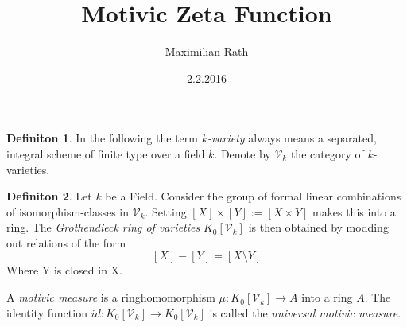 \documentclass[a4paper]{article}
\author{Maximilian Rath}
\date{2.2.2016}
\title{Motivic Zeta Function}
\theoremstyle{plain}
\theoremstyle{definition}
\newtheorem{definition}{Definiton}
\begin{document}
\maketitle

\begin{definition}
    In the following the term \emph{$k$-variety} always means a separated, integral scheme of finite type over a field $k$.
    Denote by $\mathcal{V}_k$ the category of $k$-varieties.
\end{definition}

\begin{definition}
    Let $k$ be a Field. Consider the group of formal linear combinations of isomorphism-classes in $\mathcal{V}_k$.
    Setting $[X] \times [Y] := [X \times Y]$ makes this into a ring.
    The \emph{Grothendieck ring of varieties} $K_0[\mathcal{V}_k]$ is then obtained by modding out relations of the form
    \[
        [X] - [Y] = [X \setminus Y]
    \]
    Where Y is closed in X.

    A \emph{motivic measure} is a ringhomomorphism $\mu: K_0[\mathcal{V}_k] \to A$ into a ring $A$. The identity function
    $id: K_0[\mathcal{V}_k] \to K_0[\mathcal{V}_k]$ is called the \emph{universal motivic measure}.
\end{definition}
\end{document}
